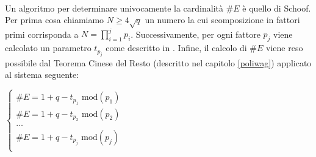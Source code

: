 \documentclass[a4paper,12pt]{tesiinfo}
\begin{document}
\\
Un algoritmo per determinare univocamente la cardinalit\`a $\#E$ \`e quello di Schoof. Per prima cosa chiamiamo $N \geq 4\sqrt{q}$ un numero la cui scomposizione in fattori primi corrisponda a $N=\prod_{i=1}^j p_i $. Successivamente, per ogni fattore $p_j$ viene calcolato un parametro $t_{p_j}$ come descritto in \cite{schoof}. Infine, il calcolo di $\#E$ viene reso possibile dal Teorema Cinese del Resto (descritto nel capitolo \ref{poliwag}) applicato al sistema seguente:
\begin{center}$
\begin{cases}
    \#E = 1+q-t_{p_1} \text{ mod}(p_1)\\
    \#E = 1+q-t_{p_2} \text{ mod}(p_2)\\
    \ldots \\
    \#E = 1+q-t_{p_j} \text{ mod}(p_j)\\
\end{cases}$
\end{center}
%
%
%
%
%
%
%
%
%
\end{document}
